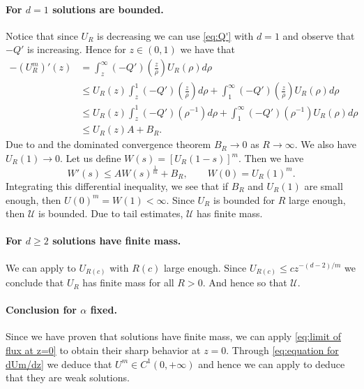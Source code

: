 \documentclass[a4paper]{article}
\theoremstyle{definition}
\begin{document}
\paragraph{For $d=1$ solutions are bounded.}
%
%
%
%
Notice that since $U_R$ is decreasing we can use \eqref{eq:Q'} with $d=1$ and observe that $-Q'$ is increasing. Hence for $z \in (0,1)$ we have that
\begin{align*}
-(U_R^m)'(z) & = \int_z^\infty (-Q')\left(\tfrac{z}{\rho}\right) U_R(\rho) d \rho                                                              \\
& \le U_R(z) \int_z^1 (-Q')\left(\tfrac{z}{\rho}\right) d \rho + \int_1^\infty (-Q')\left(\tfrac{z}{\rho}\right) U_R(\rho) d \rho \\
& \le U_R(z) \int_z^1 (-Q')\left(\rho^{-1}\right) d \rho + \int_1^\infty (-Q')\left(\rho^{-1}\right) U_R(\rho) d \rho             \\
& \le U_R(z) A + B_R.
\end{align*}
Due to  and the dominated convergence theorem $B_R \to 0$ as $R \to \infty$. We also have $U_R(1) \to 0$. Let us define $W(s) = [U_R(1-s)]^m$. Then we have
\begin{equation*}
W'(s) \le A W(s)^{\frac 1 m} + B_R, \qquad W(0) = U_R(1)^m.
\end{equation*}
Integrating this differential inequality, we see that if $B_R$ and $U_R(1)$ are small enough, then $U(0)^m = W(1) < \infty$.
Since $U_R$ is bounded for $R$ large enough, then $\mathcal U$ is bounded. Due to tail estimates, $\mathcal U$ has finite mass.
%

\paragraph{For $d \ge 2$ solutions have finite mass.}
We can apply  to $U_{R(c)}$ with $R(c)$ large enough. Since $U_{R(c)} \le c z^{-(d-2)/m}$ we conclude that $U_R$ has finite mass for all $R > 0$. And hence so that $\mathcal U$.

\paragraph{Conclusion for $\alpha$ fixed.}
Since we have proven that solutions have finite mass, we can apply \eqref{eq:limit of flux at z=0} to obtain their sharp behavior at $z = 0$. Through \eqref{eq:equation for dUm/dz} we deduce that $U^m \in C^1(0,+\infty)$ and hence we can apply  to deduce that they are weak solutions.
\end{document}
